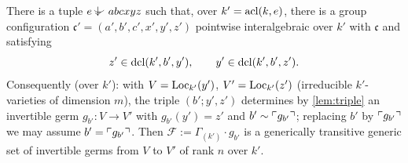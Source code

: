 \begin{proposition}[Step I]\label{prop:stepI}
There is a tuple $e\ind{}abcxyz$ such that, over $k'=\operatorname{acl}(k,e)$, there is a group
configuration $\mathfrak c'=(a',b',c',x',y',z')$ pointwise interalgebraic over $k'$ with
$\mathfrak c$ and satisfying
\[
   z'\in\operatorname{dcl}(k',b',y'),\qquad y'\in\operatorname{dcl}(k',b',z').
\]
Consequently (over $k'$): with $V=\operatorname{Loc}_{k'}(y')$, $V'=\operatorname{Loc}_{k'}(z')$ (irreducible
$k'$-varieties of dimension $m$), the triple $(b';y',z')$ determines by \cref{lem:triple}
an invertible germ $g_{b'}:V\to V'$ with $g_{b'}(y')=z'$ and $b'\sim\ulcorner g_{b'}\urcorner$;
replacing $b'$ by $\ulcorner g_{b'}\urcorner$ we may assume $b'=\ulcorner g_{b'}\urcorner$.  Then
$\mathcal F:=\Gamma_{(k')}\cdot g_{b'}$ is a generically transitive generic set of
invertible germs from $V$ to $V'$ of rank $n$ over $k'$.
\end{proposition}

